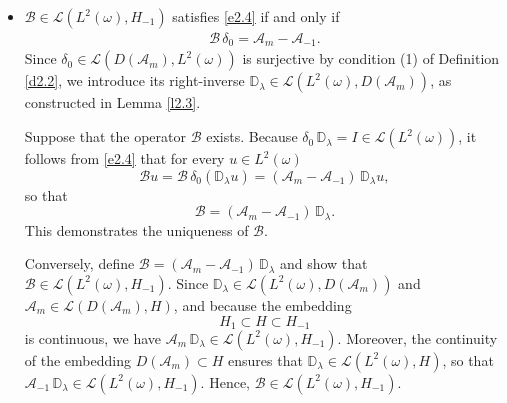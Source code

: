 \documentclass[10pt, a4]{amsart}
\makeatletter
\theoremstyle{plain}
\theoremstyle{definition}
\theoremstyle{remark}
\renewenvironment{proof}[1][\proofname]{\par
  \pushQED{\qed}%
  \normalfont \topsep6\p@\@plus6\p@\relax
  \trivlist
  \item[\hskip\labelsep
        \itshape
    #1\ \ref{#1}.]\ignorespaces
}{%
  \popQED\endtrivlist\@endpefalse
}
\numberwithin{equation}{section}
\makeatother
\begin{document}
\begin{proof}[of Lemma \ref{l2.4}]
\begin{itemize}
\item[1.]  \(\mathcal{B} \in \mathcal{L}(L^2(\omega), H_{-1})\) satisfies \eqref{e2.4} if and only if  
\begin{align}
    \mathcal{B}\,\delta_0 = \mathcal{A}_m - \mathcal{A}_{-1}.
\end{align}
Since \(\delta_0 \in \mathcal{L}(D(\mathcal{A}_m), L^2(\omega))\) is surjective by condition (1) of Definition \ref{d2.2},  we introduce its right-inverse \(\mathbb{D}_{\lambda}\in \mathcal{L}(L^2(\omega), D(\mathcal{A}_m))\), as constructed in Lemma \ref{l2.3}. 

Suppose that the operator \(\mathcal{B}\) exists. Because \(\delta_0\,\mathbb{D}_{\lambda} = I \in \mathcal{L}(L^2(\omega))\), it follows from \eqref{e2.4} that for every \(u \in L^2(\omega)\)
\[
\mathcal{B}u = \mathcal{B}\,\delta_0(\mathbb{D}_{\lambda}u) = (\mathcal{A}_m - \mathcal{A}_{-1})\,\mathbb{D}_{\lambda}u,
\]
so that
\[
\mathcal{B} = (\mathcal{A}_m - \mathcal{A}_{-1})\,\mathbb{D}_{\lambda}.
\]
This demonstrates the uniqueness of \(\mathcal{B}\).

Conversely, define \(\mathcal{B} = (\mathcal{A}_m - \mathcal{A}_{-1})\,\mathbb{D}_{\lambda}\) and show that \(\mathcal{B} \in \mathcal{L}(L^2(\omega), H_{-1})\). Since \(\mathbb{D}_{\lambda} \in \mathcal{L}(L^2(\omega), D(\mathcal{A}_m))\) and \(\mathcal{A}_m \in \mathcal{L}(D(\mathcal{A}_m), H)\), and because the embedding
$$H_1\subset H \subset H_{-1}$$ is continuous, we have \(\mathcal{A}_m\,\mathbb{D}_{\lambda} \in \mathcal{L}(L^2(\omega), H_{-1})\). Moreover, the continuity of the embedding $D(\mathcal{A}_m) \subset H$ ensures that \(\mathbb{D}_{\lambda} \in \mathcal{L}(L^2(\omega), H)\), so that \(\mathcal{A}_{-1}\,\mathbb{D}_{\lambda} \in \mathcal{L}(L^2(\omega), H_{-1})\). Hence, \(\mathcal{B} \in \mathcal{L}(L^2(\omega), H_{-1})\).



\end{itemize}
\end{proof}
\end{document}
